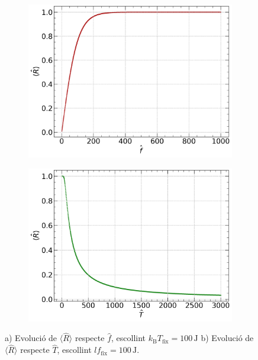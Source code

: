 \documentclass[12pt,twosides,onecolumn,openany]{article}
\begin{document}
\begin{figure}[h]
    \centering
    \begin{subfigure}[b]{0.45\textwidth}
         \includegraphics[width=\textwidth]{../../Lliurament_2/document_L2/plots/canvi_f.png}
         \caption{}
         \label{fig:força}
    \end{subfigure}
    \hspace{0.7cm}
    \begin{subfigure}[b]{0.45\textwidth}
        \includegraphics[width=\textwidth]{../../Lliurament_2/document_L2/plots/canvi_T.png}
        \caption{}
        \label{fig:temperatura}
   \end{subfigure}
   \caption{\footnotesize a) Evolució de $\langle \hat{R} \rangle$ respecte $\hat{f}$, escollint $k_{\text{B}}T_{\text{fix}} = 100\,\text{J}$ b) Evolució de $\langle \hat{R} \rangle$ respecte $\hat{T}$, escollint $lf_{\text{fix}} = 100 \, \text{J}$.}
   \label{fig:2D}
\end{figure}
\end{document}
